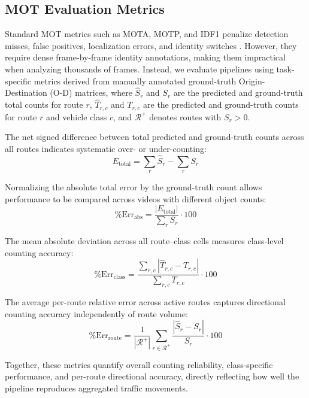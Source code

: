 \subsection*{MOT Evaluation Metrics}
\label{evaluation_metrics}

Standard MOT metrics such as MOTA, MOTP, and IDF1 penalize detection misses, false positives, localization errors, and identity switches \citep{JIMENEZBRAVO202243}. However, they require dense frame-by-frame identity annotations, making them impractical when analyzing thousands of frames. Instead, we evaluate pipelines using task-specific metrics derived from manually annotated ground-truth Origin-Destination (O-D) matrices, where $\hat{S}_r$ and $S_r$ are the predicted and ground-truth total counts for route $r$, $\hat{T}_{r,c}$ and $T_{r,c}$ are the predicted and ground-truth counts for route $r$ and vehicle class $c$, and $\mathcal{R}^+$ denotes routes with $S_r > 0$.

The net signed difference between total predicted and ground-truth counts across all routes indicates systematic over- or under-counting:
\begin{equation}
E_{\text{total}} = \sum_r \hat{S}_r - \sum_r S_r \label{eq:total_error}
\end{equation}

Normalizing the absolute total error by the ground-truth count allows performance to be compared across videos with different object counts:
\begin{equation}
\%\mathrm{Err}_{\text{abs}} = \frac{|E_{\text{total}}|}{\sum_r S_r} \cdot 100 \label{eq:pct_error}
\end{equation}

The mean absolute deviation across all route--class cells measures class-level counting accuracy:
\begin{equation}
\%\mathrm{Err}_{\text{class}} = \frac{\sum_{r,c} |\hat{T}_{r,c} - T_{r,c}|}{\sum_{r,c} T_{r,c}} \cdot 100 \label{eq:class_rel_error}
\end{equation}

The average per-route relative error across active routes captures directional counting accuracy independently of route volume:
\begin{equation}
\%\mathrm{Err}_{\text{route}} = \frac{1}{|\mathcal{R}^+|} \sum_{r \in \mathcal{R}^+} \frac{|\hat{S}_r - S_r|}{S_r} \cdot 100 \label{eq:route_rel_error}
\end{equation}

Together, these metrics quantify overall counting reliability, class-specific performance, and per-route directional accuracy, directly reflecting how well the pipeline reproduces aggregated traffic movements.

